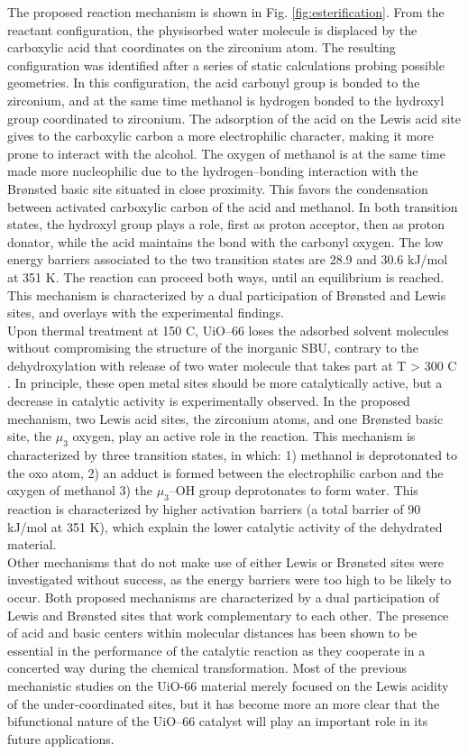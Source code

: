 The proposed reaction mechanism is shown in Fig. \ref{fig:esterification}. From the reactant configuration, the physisorbed water molecule is displaced by the carboxylic acid that coordinates on the zirconium atom. The resulting configuration was identified after a series of static calculations probing possible geometries. In this configuration, the acid carbonyl group is bonded to the zirconium, and at the same time methanol is hydrogen bonded to the hydroxyl group coordinated to zirconium. The adsorption of the acid on the Lewis acid site gives to the carboxylic carbon a more electrophilic character, making it more prone to interact with the alcohol. The oxygen of methanol is at the same time made more nucleophilic due to the hydrogen--bonding interaction with the Br\o{}nsted basic site situated in close proximity. This favors the condensation between activated carboxylic carbon of the acid and methanol. In both transition states, the hydroxyl group plays a role, first as proton acceptor, then as proton donator, while the acid maintains the bond with the carbonyl oxygen. The low energy barriers associated to the two transition states are 28.9 and 30.6 kJ/mol at 351 K. The reaction can proceed both ways, until an equilibrium is reached. This mechanism is characterized by a dual participation of Br\o{}nsted and Lewis sites, and overlays with the experimental findings. \\

Upon thermal treatment at 150 C, UiO--66 loses the adsorbed solvent molecules without compromising the structure of the inorganic SBU, contrary to the dehydroxylation with release of two water molecule that takes part at T > 300 C \cite{valenzano2011disclosing}. In principle, these open metal sites should be more catalytically active, but a decrease in catalytic activity is experimentally observed. In the proposed mechanism, two Lewis acid sites, the zirconium atoms, and one Br\o{}nsted basic site, the $\mu_3$ oxygen, play an active role in the reaction. This mechanism is characterized by three transition states, in which: 1) methanol is deprotonated to the oxo atom, 2) an adduct is formed between the electrophilic carbon and the oxygen of methanol 3) the $\mu_3$--OH group deprotonates to form water. This reaction is characterized by higher activation barriers (a total barrier of 90 kJ/mol at 351 K), which explain the lower catalytic activity of the dehydrated material.\\

Other mechanisms that do not make use of either Lewis or Br\o{}nsted sites were investigated without success, as the energy barriers were too high to be likely to occur. Both proposed mechanisms are characterized by a dual participation of Lewis and Br\o{}nsted sites that work complementary to each other.  The presence of acid and basic centers within molecular distances has been shown to be essential in the performance of the catalytic reaction as they cooperate in a concerted way during the chemical transformation. Most of the previous mechanistic studies on the UiO-66 material merely focused on the Lewis acidity of the under-coordinated sites, but it has become more an more clear that the bifunctional nature of the UiO--66 catalyst will play an important role in its future applications.

